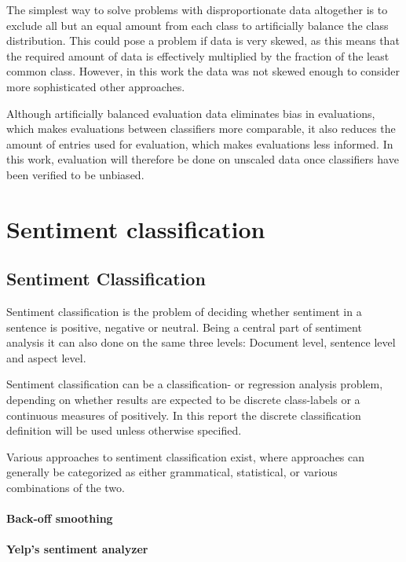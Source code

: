 \documentclass[a4paper,11pt]{kth-mag}
\begin{document}
The simplest way to solve problems with disproportionate data altogether is to exclude all but an equal amount from each class to artificially balance the class distribution. This could pose a problem if data is very skewed, as this means that the required amount of data is effectively multiplied by the fraction of the least common class. However, in this work the data was not skewed enough to consider more sophisticated other approaches.

Although artificially balanced evaluation data eliminates bias in evaluations, which makes evaluations between classifiers more comparable, it also reduces the amount of entries used for evaluation, which makes evaluations less informed. In this work, evaluation will therefore be done on unscaled data once classifiers have been verified to be unbiased.


\part{Sentiment classification}

\chapter{Sentiment Classification}
Sentiment classification is the problem of deciding whether sentiment in a sentence is positive, negative or neutral\cite{nlp_book}. Being a central part of sentiment analysis it can also done on the same three levels: Document level, sentence level and aspect level.

Sentiment classification can be a classification- or regression analysis problem\cite{liu2012sentiment}, depending on whether results are expected to be discrete class-labels or a continuous measures of positively. In this report the discrete classification definition will be used unless otherwise specified.

Various approaches to sentiment classification exist, where approaches can generally be categorized as either grammatical\cite{todo}, statistical\cite{todo}, or various combinations of the two.


\subsection{Back-off smoothing}

\subsection{Yelp's sentiment analyzer}
\end{document}
